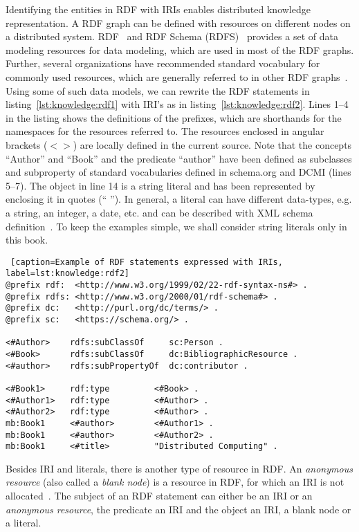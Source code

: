 \noindent
{}
Identifying the entities in RDF with IRIs enables distributed knowledge representation. A RDF graph can be defined with resources
on different nodes on a distributed system. RDF~\citep{Decker:2000} and RDF Schema (RDFS)~\citep{RDFS:2014} provides a set of 
data modeling resources for data modeling, which are used in most of the RDF graphs. Further, several organizations have 
recommended standard vocabulary for commonly used resources, which are generally referred to in other RDF graphs~\citep{Aleman-Meza:2007}. 
Using some of such data models, we can rewrite the RDF statements in listing~\ref{lst:knowledge:rdf1} with IRI's as
in listing~\ref{lst:knowledge:rdf2}.  
%
Lines 1--4  in the listing shows the definitions of the prefixes, which are shorthands for the namespaces for the resources 
referred to. The resources enclosed in angular brackets ($< >$) are locally defined in the current source. Note that the concepts
``Author'' and ``Book'' and the predicate ``author'' have been defined as subclasses and subproperty of standard vocabularies defined 
in schema.org and DCMI (lines 5--7). The object in line 14 is a string literal and has been represented by enclosing it in quotes
(`` ''). In general, a literal can have different data-types, e.g. a string, an integer, a date, etc. and can be described with XML 
schema definition~\citep{XSD:2012}. To keep the examples simple, we shall consider string literals only in this book. 

\begin{lstlisting} [caption=Example of RDF statements expressed with IRIs, label=lst:knowledge:rdf2]
@prefix rdf:  <http://www.w3.org/1999/02/22-rdf-syntax-ns#> .  
@prefix rdfs: <http://www.w3.org/2000/01/rdf-schema#> .        
@prefix dc:   <http://purl.org/dc/terms/> .                    
@prefix sc:   <https://schema.org/> .                          

<#Author>    rdfs:subClassOf     sc:Person . 
<#Book>      rdfs:subClassOf     dc:BibliographicResource .
<#author>    rdfs:subPropertyOf  dc:contributor .

<#Book1>     rdf:type         <#Book> .
<#Author1>   rdf:type         <#Author> .
<#Author2>   rdf:type         <#Author> .
mb:Book1     <#author>        <#Author1> .
mb:Book1     <#author>        <#Author2> .
mb:Book1     <#title>         "Distributed Computing" .
\end{lstlisting}

\noindent
{} 
Besides IRI and literals, there is another type of resource in RDF. An {\em anonymous resource} (also called a {\em blank node}) 
is a resource in RDF, for which an IRI is not allocated~\citep{RDF:2004}. The subject of an RDF statement can either be an IRI 
or an {\em anonymous resource}, the predicate an IRI and the object an IRI, a blank node or a literal. 

